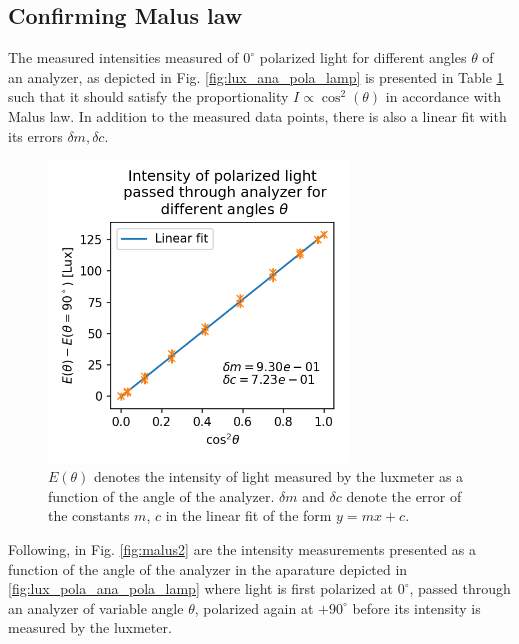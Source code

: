 \documentclass[11pt,a4paper, twocolumn]{article}
\begin{document}
  \subsection{Confirming Malus law}

  The measured intensities measured of $0^\circ$ polarized light for different angles $\theta$ of an analyzer, as depicted in Fig. \ref{fig:lux_ana_pola_lamp} is presented in Table \ref{fig:malus1} such that it should satisfy the proportionality $I \propto \cos^2(\theta)$ in accordance with Malus law. In addition to the measured data points, there is also a linear fit with its errors $\delta m, \delta c$.


  \begin{figure}[H]
    \center
    \includegraphics[width=8cm]{scripts/malus1.png}
    \caption{$E(\theta)$ denotes the intensity of light measured by the luxmeter as a function of the angle of the analyzer. $\delta m$ and $\delta c$ denote the error of the constants $m$, $c$ in the linear fit of the form $y=mx+c$.}
    \label{fig:malus1}
  \end{figure}

  Following, in Fig. \ref{fig:malus2} are the intensity measurements presented as a function of the angle of the analyzer in the aparature depicted in \ref{fig:lux_pola_ana_pola_lamp} where light is first polarized at $0^\circ$, passed through an analyzer of variable angle $\theta$, polarized again at $+90^\circ$ before its intensity is measured by the luxmeter.
  
\end{document}
